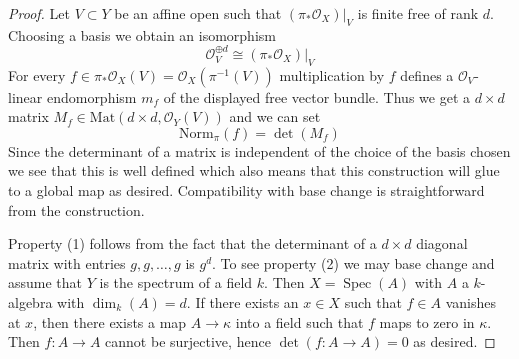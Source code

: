 \documentclass[10pt,a4paper]{amsart}
\theoremstyle{plain}
\theoremstyle{definition}
\theoremstyle{remark}
\numberwithin{equation}{subsection}
\def\Spec{\mathop{\mathrm{Spec}}}
\begin{document}
\begin{proof}
Let $V \subset Y$ be an affine open such that $(\pi_*\mathcal{O}_X)|_V$
is finite free of rank $d$. Choosing a basis we obtain an isomorphism
$$
\mathcal{O}_V^{\oplus d} \cong (\pi_*\mathcal{O}_X)|_V
$$
For every $f \in \pi_*\mathcal{O}_X(V) = \mathcal{O}_X(\pi^{-1}(V))$
multiplication by $f$ defines a $\mathcal{O}_V$-linear endomorphism
$m_f$ of the displayed free vector bundle. Thus we get a $d \times d$
matrix $M_f \in \text{Mat}(d \times d, \mathcal{O}_Y(V))$ and we can set
$$
\text{Norm}_\pi(f) = \det(M_f)
$$
Since the determinant of a matrix is independent of the choice of
the basis chosen we see that this is well defined which also means
that this construction will glue to a global map as desired.
Compatibility with base change is straightforward from the construction.

\medskip\noindent
Property (1) follows from the fact that the determinant of a
$d \times d$ diagonal matrix with entries $g, g, \ldots, g$ is $g^d$.
To see property (2) we may base change and assume that $Y$ is the
spectrum of a field $k$. Then $X = \Spec(A)$ with $A$ a $k$-algebra
with $\dim_k(A) = d$. If there exists an $x \in X$ such that
$f \in A$ vanishes at $x$, then there exists a map $A \to \kappa$
into a field such that $f$ maps to zero in $\kappa$. Then
$f : A \to A$ cannot be surjective, hence $\det(f : A \to A) = 0$
as desired.
\end{proof}
\end{document}
